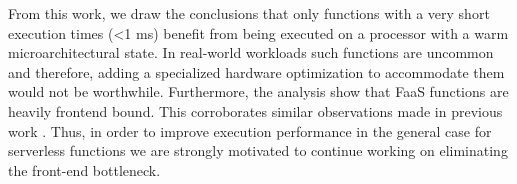 \documentclass[../main.tex]{subfiles}
\begin{document}
\begin{refsection}



From this work, we draw the conclusions that only functions with
a very short execution times (<1 ms) benefit from being executed on a
processor with a warm microarchitectural state. In real-world
workloads such functions are
uncommon~\cite{shahrad20_server_wild,mahgoub22_wisef} and therefore,
adding a specialized hardware optimization to accommodate them would
not be worthwhile. Furthermore, the analysis show that FaaS functions
are heavily frontend bound. This corroborates similar observations made
in previous work
\cite{lukewarm_serverless,gan19_open_sourc_bench_suite_micros}. Thus,
in order to improve execution performance in the general case for
serverless functions we are strongly motivated to continue working on
eliminating the front-end bottleneck.


\end{refsection}
\end{document}
